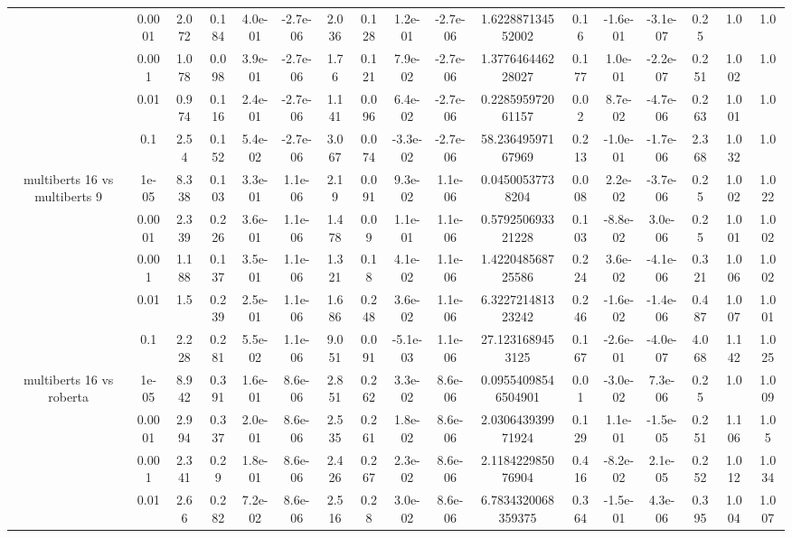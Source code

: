 \begin{tabular}{|c|c|c|c|c|c|c|c|c|c|c|c|c|c|c|c|c|}
 & 0.0001 & 2.072 & 0.184 & 4.0e-01 & -2.7e-06 & 2.036 & 0.128 & 1.2e-01 & -2.7e-06 & 1.622887134552002 & 0.16 & -1.6e-01 & -3.1e-07 & 0.25 & 1.0 & 1.0 \\
 & 0.001 & 1.078 & 0.098 & 3.9e-01 & -2.7e-06 & 1.76 & 0.121 & 7.9e-02 & -2.7e-06 & 1.377646446228027 & 0.177 & 1.0e-01 & -2.2e-07 & 0.251 & 1.002 & 1.0 \\
 & 0.01 & 0.974 & 0.116 & 2.4e-01 & -2.7e-06 & 1.141 & 0.096 & 6.4e-02 & -2.7e-06 & 0.228595972061157 & 0.02 & 8.7e-02 & -4.7e-06 & 0.263 & 1.001 & 1.0 \\
 & 0.1 & 2.54 & 0.152 & 5.4e-02 & -2.7e-06 & 3.067 & 0.074 & -3.3e-02 & -2.7e-06 & 58.23649597167969 & 0.213 & -1.0e-01 & -1.7e-06 & 2.368 & 1.032 & 1.0 \\
\hline
\multirow{5}{*}{multiberts 16 vs multiberts 9} & 1e-05 & 8.338 & 0.103 & 3.3e-01 & 1.1e-06 & 2.19 & 0.091 & 9.3e-02 & 1.1e-06 & 0.04500537738204 & 0.008 & 2.2e-02 & -3.7e-06 & 0.25 & 1.002 & 1.022 \\
 & 0.0001 & 2.339 & 0.226 & 3.6e-01 & 1.1e-06 & 1.478 & 0.09 & 1.1e-01 & 1.1e-06 & 0.579250693321228 & 0.103 & -8.8e-02 & 3.0e-06 & 0.25 & 1.001 & 1.002 \\
 & 0.001 & 1.188 & 0.137 & 3.5e-01 & 1.1e-06 & 1.321 & 0.18 & 4.1e-02 & 1.1e-06 & 1.422048568725586 & 0.224 & 3.6e-02 & -4.1e-06 & 0.321 & 1.006 & 1.002 \\
 & 0.01 & 1.5 & 0.239 & 2.5e-01 & 1.1e-06 & 1.686 & 0.248 & 3.6e-02 & 1.1e-06 & 6.322721481323242 & 0.246 & -1.6e-02 & -1.4e-06 & 0.487 & 1.007 & 1.001 \\
 & 0.1 & 2.228 & 0.281 & 5.5e-02 & 1.1e-06 & 9.051 & 0.091 & -5.1e-03 & 1.1e-06 & 27.1231689453125 & 0.167 & -2.6e-01 & -4.0e-07 & 4.068 & 1.142 & 1.025 \\
\hline
\multirow{5}{*}{multiberts 16 vs roberta } & 1e-05 & 8.942 & 0.391 & 1.6e-01 & 8.6e-06 & 2.851 & 0.262 & 3.3e-02 & 8.6e-06 & 0.09554098546504901 & 0.01 & -3.0e-02 & 7.3e-06 & 0.25 & 1.0 & 1.009 \\
 & 0.0001 & 2.994 & 0.337 & 2.0e-01 & 8.6e-06 & 2.535 & 0.261 & 1.8e-02 & 8.6e-06 & 2.030643939971924 & 0.129 & 1.1e-01 & -1.5e-05 & 0.251 & 1.106 & 1.05 \\
 & 0.001 & 2.341 & 0.29 & 1.8e-01 & 8.6e-06 & 2.426 & 0.267 & 2.3e-02 & 8.6e-06 & 2.118422985076904 & 0.416 & -8.2e-02 & 2.1e-05 & 0.252 & 1.012 & 1.034 \\
 & 0.01 & 2.66 & 0.282 & 7.2e-02 & 8.6e-06 & 2.516 & 0.28 & 3.0e-02 & 8.6e-06 & 6.7834320068359375 & 0.364 & -1.5e-01 & 4.3e-06 & 0.395 & 1.004 & 1.007 \\

\end{tabular}
